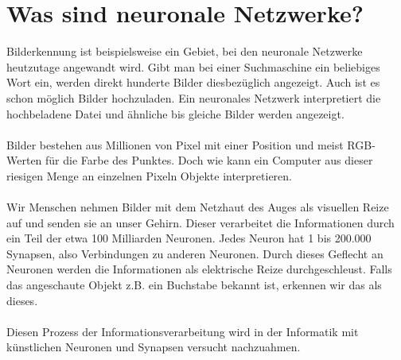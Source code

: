 \documentclass[12pt,oneside,a4paper,parskip]{scrbook}
\begin{document}
\section{Was sind neuronale Netzwerke?}
Bilderkennung ist beispielsweise ein Gebiet, bei den neuronale Netzwerke heutzutage angewandt wird. Gibt man bei einer Suchmaschine ein beliebiges Wort ein, werden direkt hunderte Bilder diesbezüglich angezeigt. Auch ist es schon möglich Bilder hochzuladen. Ein neuronales Netzwerk interpretiert die hochbeladene Datei und ähnliche bis gleiche Bilder werden angezeigt. \\
\\
Bilder bestehen aus Millionen von Pixel mit einer Position und meist RGB-Werten für die Farbe des Punktes. Doch wie kann ein Computer aus dieser riesigen Menge an einzelnen Pixeln Objekte interpretieren.\\
\\
Wir Menschen nehmen Bilder mit dem Netzhaut des Auges als visuellen Reize auf und senden sie an unser Gehirn. Dieser verarbeitet die Informationen durch ein Teil der etwa 100 Milliarden Neuronen. Jedes Neuron hat 1 bis 200.000 Synapsen, also Verbindungen zu anderen Neuronen. Durch dieses Geflecht an Neuronen werden die Informationen als elektrische Reize durchgeschleust. Falls das angeschaute Objekt z.B. ein Buchstabe bekannt ist, erkennen wir das als dieses.\\
\\
Diesen Prozess der Informationsverarbeitung wird in der Informatik mit künstlichen Neuronen und Synapsen versucht nachzuahmen. 
\end{document}

